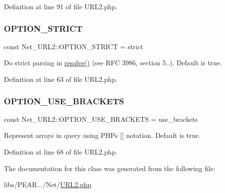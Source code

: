 Definition at line 91 of file U\+R\+L2.\+php.

\hypertarget{classNet__URL2_a766955033bdccec7175d0694df62a1a9}{}\label{classNet__URL2_a766955033bdccec7175d0694df62a1a9} 
\subsubsection{\texorpdfstring{O\+P\+T\+I\+O\+N\+\_\+\+S\+T\+R\+I\+CT}{OPTION\_STRICT}}
{\footnotesize\ttfamily const Net\+\_\+\+U\+R\+L2\+::\+O\+P\+T\+I\+O\+N\+\_\+\+S\+T\+R\+I\+CT = \textquotesingle{}strict\textquotesingle{}}

Do strict parsing in \hyperlink{classNet__URL2_a8630ab79fad624b2fd5b0df2e9123c0a}{resolve()} (see R\+FC 3986, section 5..). Default is true. 

Definition at line 63 of file U\+R\+L2.\+php.

\hypertarget{classNet__URL2_a864182f067e5df22055afc3a0dfe5a57}{}\label{classNet__URL2_a864182f067e5df22055afc3a0dfe5a57} 
\subsubsection{\texorpdfstring{O\+P\+T\+I\+O\+N\+\_\+\+U\+S\+E\+\_\+\+B\+R\+A\+C\+K\+E\+TS}{OPTION\_USE\_BRACKETS}}
{\footnotesize\ttfamily const Net\+\_\+\+U\+R\+L2\+::\+O\+P\+T\+I\+O\+N\+\_\+\+U\+S\+E\+\_\+\+B\+R\+A\+C\+K\+E\+TS = \textquotesingle{}use\+\_\+brackets\textquotesingle{}}

Represent arrays in query using P\+HP\textquotesingle{}s \mbox{[}\mbox{]} notation. Default is true. 

Definition at line 68 of file U\+R\+L2.\+php.



The documentation for this class was generated from the following file\+:\begin{DoxyCompactItemize}
\item 
libs/\+P\+E\+A\+R.../\+Net/\hyperlink{URL2_8php}{U\+R\+L2.\+php}\end{DoxyCompactItemize}
